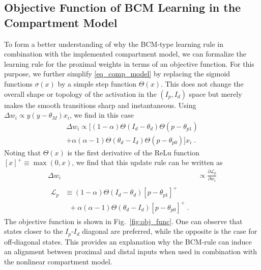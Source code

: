 \documentclass[utf8]{frontiersSCNS} %
\begin{document}
\subsection{Objective Function of BCM Learning in the Compartment Model}
\label{sect:Obj_Func}

To form a better understanding of why the BCM-type learning rule
in combination with the implemented compartment model, we can formalize
the learning rule for the proximal weights in terms of an objective function.
For this purpose, we further simplify \eqref{eq_comp_model} by replacing
the sigmoid functions $\sigma(x)$ by a simple step function $\Theta(x)$. 
This does not change the overall shape or topology of the activation
in the $(I_p,I_d)$ space but merely makes the smooth transitions sharp
and instantaneous. Using $\Delta w_i \propto y\left(y - \theta_M \right) x_i$,
we find in this case
\begin{equation}
\begin{split}
\Delta w_i \propto [ (1-\alpha) \Theta(I_d - \theta_{d})\Theta(p-\theta_{p1})
\\ + \alpha (\alpha - 1)\Theta(\theta_{d} - I_d)\Theta(p-\theta_{p0}) ]x_i \; .
\end{split}
\end{equation}
Noting that $\Theta(x)$ is the first derivative of the ReLu function $[x]^+ \equiv \max(0,x)$,
we find that this update rule can be written as
\begin{align}
\Delta w_i &\propto \frac{\partial \mathcal{L}_p}{\partial w_i}\\
\begin{split}
\mathcal{L}_p &\equiv (1-\alpha) \Theta(I_d - \theta_{d})[p-\theta_{p1}]^+\\
&\;\; + \alpha (\alpha - 1)\Theta(\theta_{d} - I_d)[p-\theta_{p0}]^+ \; .
\end{split}\label{eq:obj_func}
\end{align}
The objective function is shown in Fig.~\ref{fig:obj_func}. 
One can observe that states closer to the $I_p$-$I_d$ diagonal 
are preferred, while the opposite is the case for off-diagonal states. 
This provides an explanation why the BCM-rule can induce 
an alignment between proximal and distal inputs when used 
in combination with the nonlinear compartment model. 
\end{document}
